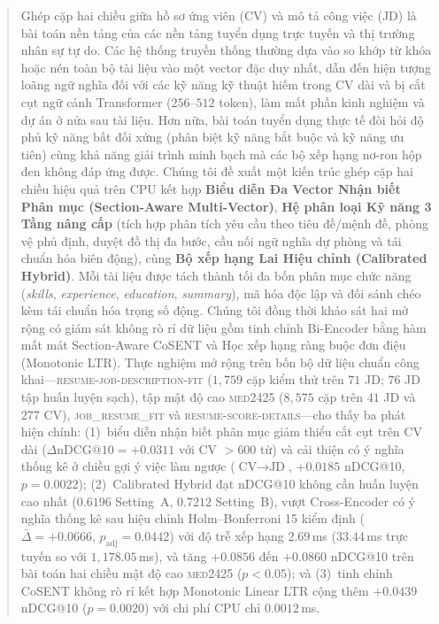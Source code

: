 \begin{abstract}
Ghép cặp hai chiều giữa hồ sơ ứng viên (CV) và mô tả công việc (JD) là bài toán nền tảng của các nền tảng tuyển dụng trực tuyến và thị trường nhân sự tự do. Các hệ thống truyền thống thường dựa vào so khớp từ khóa hoặc nén toàn bộ tài liệu vào một vector đặc duy nhất, dẫn đến hiện tượng loãng ngữ nghĩa đối với các kỹ năng kỹ thuật hiếm trong CV dài và bị cắt cụt ngữ cảnh Transformer ($256$--$512$ token), làm mất phần kinh nghiệm và dự án ở nửa sau tài liệu. Hơn nữa, bài toán tuyển dụng thực tế đòi hỏi độ phủ kỹ năng bất đối xứng (phân biệt kỹ năng bắt buộc và kỹ năng ưu tiên) cùng khả năng giải trình minh bạch mà các bộ xếp hạng nơ-ron hộp đen không đáp ứng được. Chúng tôi đề xuất một kiến trúc ghép cặp hai chiều hiệu quả trên CPU kết hợp \textbf{Biểu diễn Đa Vector Nhận biết Phân mục (Section-Aware Multi-Vector)}, \textbf{Hệ phân loại Kỹ năng 3 Tầng nâng cấp} (tích hợp phân tích yêu cầu theo tiêu đề/mệnh đề, phòng vệ phủ định, duyệt đồ thị đa bước, cầu nối ngữ nghĩa dự phòng và tái chuẩn hóa biên động), cùng \textbf{Bộ xếp hạng Lai Hiệu chỉnh (Calibrated Hybrid)}. Mỗi tài liệu được tách thành tối đa bốn phân mục chức năng (\textit{skills}, \textit{experience}, \textit{education}, \textit{summary}), mã hóa độc lập và đối sánh chéo kèm tái chuẩn hóa trọng số động. Chúng tôi đồng thời khảo sát hai mở rộng có giám sát không rò rỉ dữ liệu gồm tinh chỉnh Bi-Encoder bằng hàm mất mát Section-Aware CoSENT và Học xếp hạng ràng buộc đơn điệu (Monotonic LTR). Thực nghiệm mở rộng trên bốn bộ dữ liệu chuẩn công khai---\textsc{resume-job-description-fit} ($1{,}759$ cặp kiểm thử trên $71$ JD; $76$ JD tập huấn luyện sạch), tập mật độ cao \textsc{med2425} ($8{,}575$ cặp trên $41$ JD và $277$ CV), \textsc{job\_resume\_fit} và \textsc{resume-score-details}---cho thấy ba phát hiện chính: (1)~biểu diễn nhận biết phân mục giảm thiểu cắt cụt trên CV dài ($\Delta\text{nDCG@10} = +0.0311$ với CV $>600$ từ) và cải thiện có ý nghĩa thống kê ở chiều gợi ý việc làm ngược ($\text{CV} \rightarrow \text{JD}$, $+0.0185$ nDCG@10, $p = 0.0022$); (2)~Calibrated Hybrid đạt nDCG@10 không cần huấn luyện cao nhất ($0.6196$ Setting~A, $0.7212$ Setting~B), vượt Cross-Encoder có ý nghĩa thống kê sau hiệu chỉnh Holm--Bonferroni 15 kiểm định ($\bar{\Delta} = +0.0666$, $p_{\text{adj}} = 0.0442$) với độ trễ xếp hạng $2.69$\,ms ($33.44$\,ms trực tuyến so với $1{,}178.05$\,ms), và tăng $+0.0856$ đến $+0.0860$ nDCG@10 trên bài toán hai chiều mật độ cao \textsc{med2425} ($p < 0.05$); và (3)~tinh chỉnh CoSENT không rò rỉ kết hợp Monotonic Linear LTR cộng thêm $+0.0439$ nDCG@10 ($p = 0.0020$) với chi phí CPU chỉ $0.0012$\,ms.

\end{abstract}
